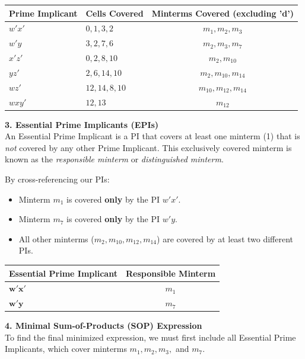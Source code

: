 \documentclass[12pt,a3paper]{article}
\begin{document}
\begin{enumerate}
\begin{tcolorbox}[enhanced,breakable,ansbox,colback=cC!4,colframe=cC,boxrule=0.8pt,arc=5pt,title={\textbf{Answer}},fonttitle=\bfseries\color{white},colbacktitle=cC]
\begin{center}
\begin{tabular}{llc}
    \toprule
    \textbf{Prime Implicant} & \textbf{Cells Covered} & \textbf{Minterms Covered (excluding 'd')} \\
    \midrule
    $w'x'$ & $0, 1, 3, 2$ & $m_1, m_2, m_3$ \\
    $w'y$ & $3, 2, 7, 6$ & $m_2, m_3, m_7$ \\
    $x'z'$ & $0, 2, 8, 10$ & $m_2, m_{10}$ \\
    $yz'$ & $2, 6, 14, 10$ & $m_2, m_{10}, m_{14}$ \\
    $wz'$ & $12, 14, 8, 10$ & $m_{10}, m_{12}, m_{14}$ \\
    $wxy'$ & $12, 13$ & $m_{12}$ \\
    \bottomrule
\end{tabular}
\end{center}

\vspace{0.3cm}
\textbf{3. Essential Prime Implicants (EPIs)} \\
An Essential Prime Implicant is a PI that covers at least one minterm (1) that is \textit{not} covered by any other Prime Implicant. This exclusively covered minterm is known as the \textit{responsible minterm} or \textit{distinguished minterm}.

By cross-referencing our PIs:
\begin{itemize}
    \item Minterm $m_1$ is covered \textbf{only} by the PI $w'x'$.
    \item Minterm $m_7$ is covered \textbf{only} by the PI $w'y$.
    \item All other minterms ($m_2, m_{10}, m_{12}, m_{14}$) are covered by at least two different PIs.
\end{itemize}

\begin{center}
\begin{tabular}{lc}
    \toprule
    \textbf{Essential Prime Implicant} & \textbf{Responsible Minterm} \\
    \midrule
    \textcolor{cC}{$\mathbf{w'x'}$} & $m_1$ \\
    \textcolor{cC}{$\mathbf{w'y}$} & $m_7$ \\
    \bottomrule
\end{tabular}
\end{center}

\vspace{0.3cm}
\textbf{4. Minimal Sum-of-Products (SOP) Expression} \\
To find the final minimized expression, we must first include all Essential Prime Implicants, which cover minterms $m_1, m_2, m_3,$ and $m_7$. 


\end{tcolorbox}
\end{enumerate}
\end{document}
